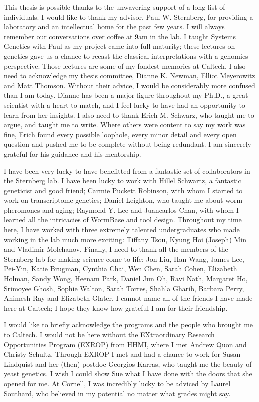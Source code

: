 \documentclass[12pt]{caltech_thesis}
\begin{document}
\begin{acknowledgements}
  This thesis is possible thanks to the unwavering support of a long list of
  individuals. I would like to thank my advisor, Paul W. Sternberg, for
  providing a laboratory and an intellectual home for the past few years. I will
  always remember our conversations over coffee at 9am in the lab. I taught
  Systems Genetics with Paul as my project came into full maturity; these
  lectures on genetics gave us a chance to recast the classical interpretations
  with a genomics perspective. Those lectures are some of my fondest memories
  at Caltech. I also need to acknowledge my thesis committee, Dianne K. Newman,
  Elliot Meyerowitz and Matt Thomson. Without their advice, I would be
  considerably more confused than I am today. Dianne has been a major figure
  throughout my Ph.D., a great scientist with a heart to match, and I feel
  lucky to have had an opportunity to learn from her insights. I also need to
  thank Erich M. Schwarz, who taught me to argue, and taught me to write. Where
  others were content to say my work was fine, Erich found every possible
  loophole, every minor detail and every open question and pushed me to be
  complete without being redundant. I am sincerely grateful for his guidance and
  his mentorship.

  I have been very lucky to have benefitted from a fantastic set of
  collaborators in the Sternberg lab. I have been lucky to work with Hillel
  Schwartz, a fantastic geneticist and good friend; Carmie Puckett Robinson,
  with whom I started to work on transcriptome genetics; Daniel Leighton, who
  taught me about worm pheromones and aging; Raymond Y. Lee and Juancarlos Chan,
  with whom I learned all the intricacies of WormBase and tool design.
  Throughout my time here, I have worked with three extremely talented
  undergraduates who made working in the lab much more exciting: Tiffany Tsou,
  Kyung Hoi (Joseph) Min and Vladimir Molchanov. Finally, I need to thank all
  the members of the Sternberg lab for making science come to life: Jon Liu, Han
  Wang, James Lee, Pei-Yin, Katie Brugman, Cynthia Chai, Wen Chen, Sarah Cohen,
  Elizabeth Holman, Sandy Wong, Heenam Park, Daniel Jun Oh, Ravi Nath, Margaret
  Ho, Srimoyee Ghosh, Sophie Walton, Sarah Torres, Shahla Gharib, Barbara Perry,
  Animesh Ray and Elizabeth Glater. I cannot name all of the friends I have
  made here at Caltech; I hope they know how grateful I am for their friendship.

  I would like to briefly acknowledge the programs and the people who brought me
  to Caltech. I would not be here without the EXtraordinary Research
  Opportunities Program (EXROP) from HHMI, where I met Andrew Quon and Christy
  Schultz. Through EXROP I met and had a chance to work for Susan Lindquist and
  her (then) postdoc Georgios Karras, who taught me the beauty of yeast
  genetics. I wish I could show Sue what I have done with the doors that she
  opened for me. At Cornell, I was incredibly lucky to be adviced by Laurel
  Southard, who believed in my potential no matter what grades might say.


\end{acknowledgements}
\end{document}
